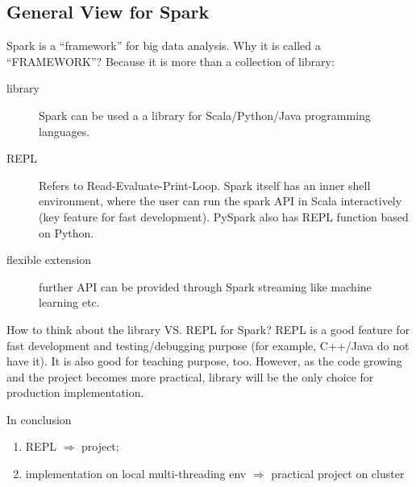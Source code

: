 \documentclass[notheorems, aspectratio=54]{beamer}
\begin{document}

\subsection{General View for Spark}
\begin{frame}

Spark is a ``framework'' for big data analysis. Why it is called a ``FRAMEWORK''? 
Because it is more than a collection of library:
\begin{description}
 \item [library] Spark can be used a a library for Scala/Python/Java programming languages.
 \item [REPL] Refers to Read-Evaluate-Print-Loop. Spark itself has an inner shell environment, 
 where the user can run the spark API in Scala interactively (key feature for fast development). 
 PySpark also has REPL function based on Python. 
 \item [flexible extension] further API can be provided through Spark streaming like
 machine learning etc.
\end{description}

\end{frame}

\begin{frame}


    \begin{block}{How to think about the library VS. REPL for Spark?}
    REPL is a good feature for fast development and testing/debugging purpose
    (for example, C++/Java do not have it). It is also 
    good for teaching purpose, too. However, as the code growing and the project 
    becomes more practical, library will be the only 
    choice for production implementation.     
    \end{block}
    
    In conclusion
   \begin{enumerate}
    \item  REPL $\Longrightarrow$ project;
    \item  implementation on local multi-threading env $\Longrightarrow$ practical project on cluster
   \end{enumerate}
      
\end{frame}
\end{document}
